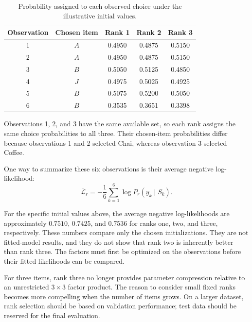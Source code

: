 \documentclass[12pt,oneside]{report}
\begin{document}
\begin{table}[htbp]
    \centering
    \small
    \caption{Probability assigned to each observed choice
    under the illustrative initial values.}
    \label{tab:low-rank-observed-choice-probabilities}
    \begin{tabular}{ccccc}
        \toprule
        Observation & Chosen item & Rank 1 & Rank 2 & Rank 3\\
        \midrule
        1 & $A$ & 0.4950 & 0.4875 & 0.5150\\
        2 & $A$ & 0.4950 & 0.4875 & 0.5150\\
        3 & $B$ & 0.5050 & 0.5125 & 0.4850\\
        4 & $J$ & 0.4975 & 0.5025 & 0.4925\\
        5 & $B$ & 0.5075 & 0.5200 & 0.5050\\
        6 & $B$ & 0.3535 & 0.3651 & 0.3398\\
        \bottomrule
    \end{tabular}
\end{table}

Observations 1, 2, and 3 have the same available set,
so each rank assigns the same choice probabilities to
all three. Their chosen-item probabilities differ
because observations 1 and 2 selected Chai, whereas
observation 3 selected Coffee.

One way to summarize these six observations is their
average negative log-likelihood:
\begin{equation}
    \overline{\mathcal L}_r
    =-\frac{1}{6}\sum_{k=1}^{6}
      \log P_r(y_k\mid S_k).
    \label{eq:low-rank-example-nll}
\end{equation}

For the specific initial values above, the average
negative log-likelihoods are approximately $0.7510$,
$0.7425$, and $0.7536$ for ranks one, two, and three,
respectively. These numbers compare only the chosen
initializations. They are not fitted-model results,
and they do not show that rank two is inherently
better than rank three. The factors must first be
optimized on the observations before their fitted
likelihoods can be compared.

For three items, rank three no longer provides
parameter compression relative to an unrestricted
$3\times3$ factor product. The reason to consider
small fixed ranks becomes more compelling when the
number of items grows. On a larger dataset, rank
selection should be based on validation performance;
test data should be reserved for the final evaluation.
\end{document}

